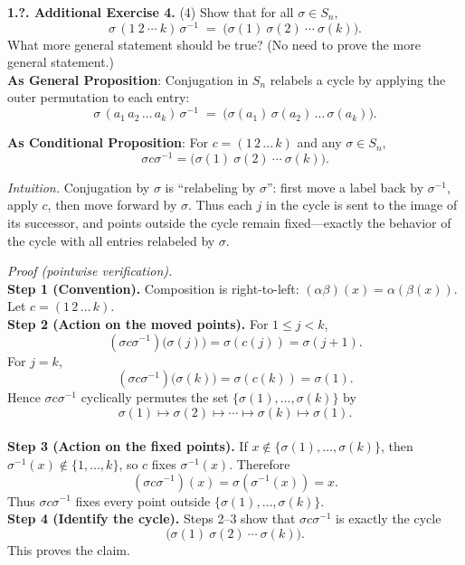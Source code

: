 \documentclass[12pt]{article}
\theoremstyle{definition}
\begin{document}
\newpage

\noindent \textbf{1.?. Additional Exercise 4.}
(4) Show that for all $\sigma\in S_n$,
\[
\sigma\,(1\ 2\ \cdots\ k)\,\sigma^{-1} \;=\; \big(\sigma(1)\ \sigma(2)\ \cdots\ \sigma(k)\big).
\]
What more general statement should be true? (No need to prove the more general statement.)\\ %

\noindent\textbf{As General Proposition}: Conjugation in $S_n$ relabels a cycle by applying the outer permutation to each entry:
\[
\sigma\,(a_1\,a_2\,\dots\,a_k)\,\sigma^{-1} \;=\; \big(\sigma(a_1)\,\sigma(a_2)\,\dots\,\sigma(a_k)\big).
\]

\noindent \textbf{As Conditional Proposition}: For $c=(1\,2\,\dots\,k)$ and any $\sigma\in S_n$,
\[
\sigma c \sigma^{-1}=\big(\sigma(1)\ \sigma(2)\ \cdots\ \sigma(k)\big).
\]

\newpage

\dotfill

\emph{Intuition.} Conjugation by $\sigma$ is “relabeling by $\sigma$”: first move a label back by $\sigma^{-1}$, apply $c$, then move forward by $\sigma$. Thus each $j$ in the cycle is sent to the image of its successor, and points outside the cycle remain fixed—exactly the behavior of the cycle with all entries relabeled by $\sigma$.\\

\dotfill

\emph{Proof (pointwise verification).}\\
\textbf{Step 1 (Convention).} Composition is right-to-left: $(\alpha\beta)(x)=\alpha(\beta(x))$. Let $c=(1\,2\,\dots\,k)$.\\
\textbf{Step 2 (Action on the moved points).} For $1\le j<k$,
\[
(\sigma c \sigma^{-1})\big(\sigma(j)\big)=\sigma\!\left(c(j)\right)=\sigma(j+1).
\]
For $j=k$,
\[
(\sigma c \sigma^{-1})\big(\sigma(k)\big)=\sigma\!\left(c(k)\right)=\sigma(1).
\]
Hence $\sigma c \sigma^{-1}$ cyclically permutes the set $\{\sigma(1),\dots,\sigma(k)\}$ by
\[
\sigma(1)\mapsto \sigma(2)\mapsto \cdots \mapsto \sigma(k)\mapsto \sigma(1).
\]\\
\textbf{Step 3 (Action on the fixed points).} If $x\notin\{\sigma(1),\dots,\sigma(k)\}$, then $\sigma^{-1}(x)\notin\{1,\dots,k\}$, so $c$ fixes $\sigma^{-1}(x)$. Therefore
\[
(\sigma c \sigma^{-1})(x)=\sigma\!\left(\sigma^{-1}(x)\right)=x.
\]
Thus $\sigma c \sigma^{-1}$ fixes every point outside $\{\sigma(1),\dots,\sigma(k)\}$.\\
\textbf{Step 4 (Identify the cycle).} Steps 2–3 show that $\sigma c \sigma^{-1}$ is exactly the cycle
\[
\big(\sigma(1)\ \sigma(2)\ \cdots\ \sigma(k)\big).
\]
This proves the claim.\\
\end{document}

